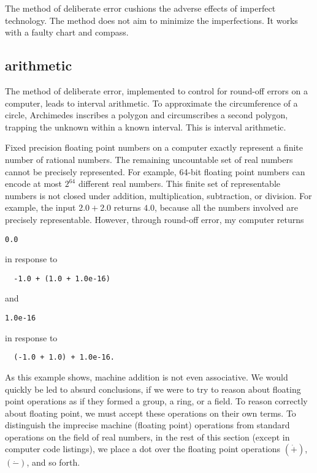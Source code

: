 The method of deliberate error cushions the adverse effects of imperfect technology.
The method does not aim to minimize the imperfections.  It works with a faulty
chart and compass.

\subsection{arithmetic}

The method of deliberate error, implemented to control for round-off errors on a computer,
leads to interval arithmetic.  To approximate the circumference of a circle, Archimedes inscribes a polygon and circumscribes a second polygon, trapping the unknown within a known interval.  This is interval arithmetic.


Fixed precision 
floating point numbers on a computer exactly represent a finite
number of rational numbers.  The remaining uncountable set of real numbers cannot
be precisely represented.  For example, 64-bit floating point numbers can encode at most
$2^{64}$ different real numbers.    This finite set of representable numbers is not
closed under addition, multiplication, subtraction, or division.  For example,
the input $2.0 + 2.0$ returns $4.0$, because all the numbers involved
are precisely representable.  However, through round-off error, my computer returns 
\begin{verbatim}0.0
\end{verbatim} 
in response to
\begin{verbatim}
  -1.0 + (1.0 + 1.0e-16)
\end{verbatim}
and 
\begin{verbatim}1.0e-16
\end{verbatim} 
in response to 
\begin{verbatim}
  (-1.0 + 1.0) + 1.0e-16.
\end{verbatim}
As this example shows, machine addition is not even associative.  We would quickly be led to absurd
conclusions, if we were to try to reason about floating point operations as if
they formed a group, a ring, or a field.  To reason correctly about floating point, we
must accept these operations on their own terms.  To distinguish the imprecise
machine (floating point) operations from standard operations on the field of real numbers, in the rest of this section (except in computer code listings), 
we place a dot over the floating point operations $(\dot +)$, $(\dot -)$, and so forth.

